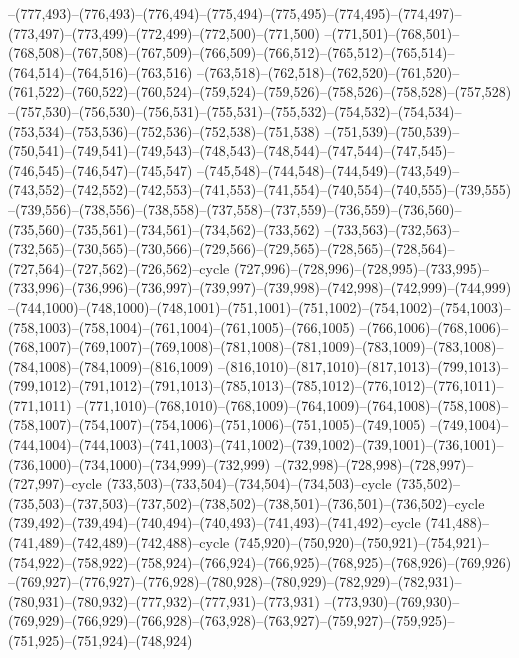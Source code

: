 --(777,493)--(776,493)--(776,494)--(775,494)--(775,495)--(774,495)--(774,497)--(773,497)--(773,499)--(772,499)--(772,500)--(771,500)
--(771,501)--(768,501)--(768,508)--(767,508)--(767,509)--(766,509)--(766,512)--(765,512)--(765,514)--(764,514)--(764,516)--(763,516)
--(763,518)--(762,518)--(762,520)--(761,520)--(761,522)--(760,522)--(760,524)--(759,524)--(759,526)--(758,526)--(758,528)--(757,528)
--(757,530)--(756,530)--(756,531)--(755,531)--(755,532)--(754,532)--(754,534)--(753,534)--(753,536)--(752,536)--(752,538)--(751,538)
--(751,539)--(750,539)--(750,541)--(749,541)--(749,543)--(748,543)--(748,544)--(747,544)--(747,545)--(746,545)--(746,547)--(745,547)
--(745,548)--(744,548)--(744,549)--(743,549)--(743,552)--(742,552)--(742,553)--(741,553)--(741,554)--(740,554)--(740,555)--(739,555)
--(739,556)--(738,556)--(738,558)--(737,558)--(737,559)--(736,559)--(736,560)--(735,560)--(735,561)--(734,561)--(734,562)--(733,562)
--(733,563)--(732,563)--(732,565)--(730,565)--(730,566)--(729,566)--(729,565)--(728,565)--(728,564)--(727,564)--(727,562)--(726,562)--cycle
(727,996)--(728,996)--(728,995)--(733,995)--(733,996)--(736,996)--(736,997)--(739,997)--(739,998)--(742,998)--(742,999)--(744,999)
--(744,1000)--(748,1000)--(748,1001)--(751,1001)--(751,1002)--(754,1002)--(754,1003)--(758,1003)--(758,1004)--(761,1004)--(761,1005)--(766,1005)
--(766,1006)--(768,1006)--(768,1007)--(769,1007)--(769,1008)--(781,1008)--(781,1009)--(783,1009)--(783,1008)--(784,1008)--(784,1009)--(816,1009)
--(816,1010)--(817,1010)--(817,1013)--(799,1013)--(799,1012)--(791,1012)--(791,1013)--(785,1013)--(785,1012)--(776,1012)--(776,1011)--(771,1011)
--(771,1010)--(768,1010)--(768,1009)--(764,1009)--(764,1008)--(758,1008)--(758,1007)--(754,1007)--(754,1006)--(751,1006)--(751,1005)--(749,1005)
--(749,1004)--(744,1004)--(744,1003)--(741,1003)--(741,1002)--(739,1002)--(739,1001)--(736,1001)--(736,1000)--(734,1000)--(734,999)--(732,999)
--(732,998)--(728,998)--(728,997)--(727,997)--cycle
(733,503)--(733,504)--(734,504)--(734,503)--cycle
(735,502)--(735,503)--(737,503)--(737,502)--(738,502)--(738,501)--(736,501)--(736,502)--cycle
(739,492)--(739,494)--(740,494)--(740,493)--(741,493)--(741,492)--cycle
(741,488)--(741,489)--(742,489)--(742,488)--cycle
(745,920)--(750,920)--(750,921)--(754,921)--(754,922)--(758,922)--(758,924)--(766,924)--(766,925)--(768,925)--(768,926)--(769,926)
--(769,927)--(776,927)--(776,928)--(780,928)--(780,929)--(782,929)--(782,931)--(780,931)--(780,932)--(777,932)--(777,931)--(773,931)
--(773,930)--(769,930)--(769,929)--(766,929)--(766,928)--(763,928)--(763,927)--(759,927)--(759,925)--(751,925)--(751,924)--(748,924)
